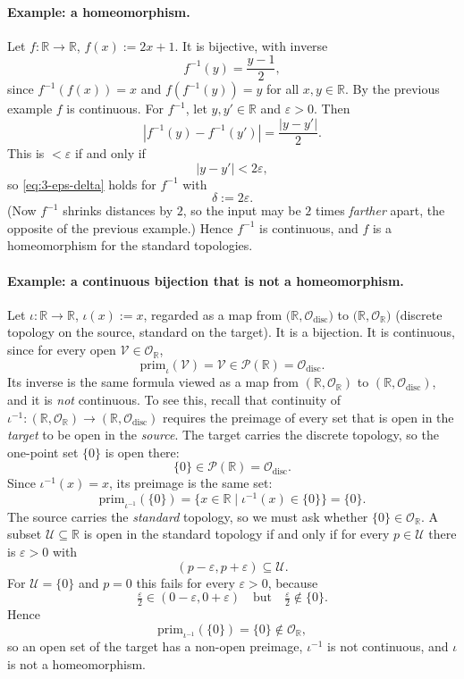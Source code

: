 \documentclass[11pt]{article}
\newcommand{\prim}[1]{\mathrm{prim}_{#1}}
\begin{document}
\paragraph{Example: a homeomorphism.} Let $f:\mathbb R\to\mathbb R$, $f(x):=2x+1$. It is bijective, with inverse
\[
f^{-1}(y)=\frac{y-1}{2},
\]
since $f^{-1}(f(x))=x$ and $f(f^{-1}(y))=y$ for all $x,y\in\mathbb R$. By the previous example $f$ is continuous. For $f^{-1}$, let $y,y'\in\mathbb R$ and $\varepsilon>0$. Then
\[
|f^{-1}(y)-f^{-1}(y')|=\frac{|y-y'|}{2}.
\]
This is $<\varepsilon$ if and only if
\[
|y-y'|<2\varepsilon,
\]
so \eqref{eq:3-eps-delta} holds for $f^{-1}$ with
\[
\delta:=2\varepsilon.
\]
(Now $f^{-1}$ shrinks distances by $2$, so the input may be $2$ times \emph{farther} apart, the opposite of the previous example.) Hence $f^{-1}$ is continuous, and $f$ is a homeomorphism for the standard topologies.

\paragraph{Example: a continuous bijection that is not a homeomorphism.} Let $\iota:\mathbb R\to\mathbb R$, $\iota(x):=x$, regarded as a map from $\big(\mathbb R,\mathcal O_{\mathrm{disc}}\big)$ to $\big(\mathbb R,\mathcal O_{\mathbb R}\big)$ (discrete topology on the source, standard on the target). It is a bijection. It is continuous, since for every open $\mathcal V\in\mathcal O_{\mathbb R}$,
\[
\prim{\iota}(\mathcal V)=\mathcal V\in\mathcal P(\mathbb R)=\mathcal O_{\mathrm{disc}}.
\]
Its inverse is the same formula viewed as a map from $(\mathbb R,\mathcal O_{\mathbb R})$ to $(\mathbb R,\mathcal O_{\mathrm{disc}})$, and it is \emph{not} continuous. To see this, recall that continuity of $\iota^{-1}:(\mathbb R,\mathcal O_{\mathbb R})\to(\mathbb R,\mathcal O_{\mathrm{disc}})$ requires the preimage of every set that is open in the \emph{target} to be open in the \emph{source}. The target carries the discrete topology, so the one-point set $\{0\}$ is open there:
\[
\{0\}\in\mathcal P(\mathbb R)=\mathcal O_{\mathrm{disc}}.
\]
Since $\iota^{-1}(x)=x$, its preimage is the same set:
\[
\prim{\iota^{-1}}(\{0\})=\{x\in\mathbb R\mid \iota^{-1}(x)\in\{0\}\}=\{0\}.
\]
The source carries the \emph{standard} topology, so we must ask whether $\{0\}\in\mathcal O_{\mathbb R}$. A subset $\mathcal U\subseteq\mathbb R$ is open in the standard topology if and only if for every $p\in\mathcal U$ there is $\varepsilon>0$ with
\[
(p-\varepsilon,p+\varepsilon)\subseteq\mathcal U.
\]
For $\mathcal U=\{0\}$ and $p=0$ this fails for every $\varepsilon>0$, because
\[
\tfrac{\varepsilon}{2}\in(0-\varepsilon,0+\varepsilon)\quad\text{but}\quad\tfrac{\varepsilon}{2}\notin\{0\}.
\]
Hence
\[
\prim{\iota^{-1}}(\{0\})=\{0\}\notin\mathcal O_{\mathbb R},
\]
so an open set of the target has a non-open preimage, $\iota^{-1}$ is not continuous, and $\iota$ is not a homeomorphism.
\end{document}
